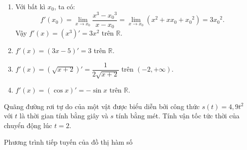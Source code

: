 \begin{bt}
\begin{bt}
{\begin{enumerate}
	Vậy hàm số $y=cx^2$ (với $c$ là hằng số) có đạo hàm là hàm số $y'=2cx$.
	\item Với bất kì $x_0$, ta có:\\
	$$f'(x_0)=\lim\limits_{x \to x_0}\dfrac{x^3-{x_0}^3}{x-x_0}=\lim\limits_{x \to x_0}(x^2+xx_0+{x_0}^2)=3{x_0}^2.$$
	Vậy $f'(x)=\left(x^3\right)'=3x^2$ trên $\mathbb{R}$.
	\item $f'(x)=(3x-5)'=3$ trên $\mathbb{R}$.
	\item $f'(x)=\left(\sqrt{x+2}\right)'=\dfrac{1}{2\sqrt{x+2}}$ trên $(-2,+\infty)$.
	\item $f'(x)=(\cos x)'=-\sin x$ trên $\mathbb{R}$.
	\end{enumerate}}
\end{bt}
\begin{bt}%
	Quãng đường rơi tự do của một vật được biểu diễn bởi công thức $s(t)=4{,}9t^2$ với $t$ là thời gian tính bằng giây và $s$ tính bằng mét. Tính vận tốc tức thời của chuyển động lúc $t=2$.
\end{bt}
\begin{dang}{Phương trình tiếp tuyến của đồ thị hàm số }
\end{dang}

\end{bt}
